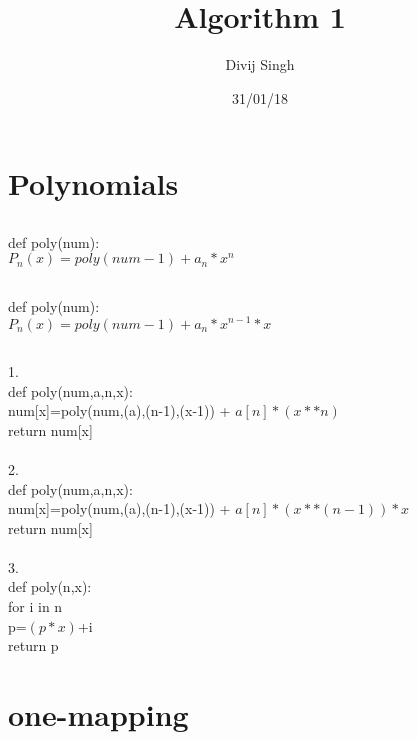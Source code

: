 \documentclass{article}
\title{Algorithm 1}
\author{Divij Singh}
\date{31/01/18}
\begin{document}
	\maketitle
	
	\section{Polynomials}
	
	\subsection{}
		def poly(num):\\
			$P_n (x) = poly(num-1) + a_n * x^n$
	
	\subsection{}
	
		def poly(num):\\
			$P_n (x) = poly(num-1) + a_n * x^{n-1} * x$
			
	\subsection{}
		
		1.\\
		def poly(num,a,n,x):\\
		 num[x]=poly(num,(a),(n-1),(x-1)) + $a[n]*(x**n)$\\
		return num[x]\\
		\\
		2.\\
		def poly(num,a,n,x):\\
		 num[x]=poly(num,(a),(n-1),(x-1)) + $a[n]*(x**(n-1))*x$\\
		return num[x]\\
		\\
		3.\\
		def poly(n,x):\\
		 for i in n\\
		  p=$(p*x)$+i\\
		return p\\
		
	
	\section{one-mapping}
	\subsection{}
		
\end{document}
